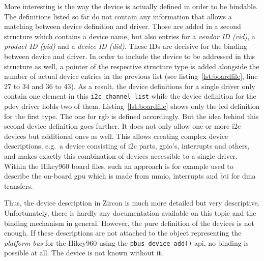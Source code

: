 More interesting is the way the device is actually defined in order to be bindable.
The definitions listed so far do not contain any information that allows a matching between device definition and driver.
Those are added in a second structure which contains a device name, but also entries for a \textit{vendor ID (vid)}, a \textit{product ID (pid)} and a \textit{device ID (did)}.
These IDs are decisive for the binding between device and driver.
In order to include the device to be addressed in this structure as well, a pointer of the respective structure type is added alongside the number of actual device entries in the previous list (see listing~\ref{lst:boardfile}, line 27 to 34 and 36 to 43).
%
As a result, the device definitions for a single driver only contain one element in this \texttt{i2c_channel_list} while the device definition for the pdev driver holds two of them.
Listing~\ref{lst:boardfile} shows only the \ac{lcd} definition for the first type.
The one for \ac{rgb} is defined accordingly.
But the idea behind this second device definition goes further.
It does not only allow one or more \ac{i2c} devices but additional ones as well.
This allows creating complex device descriptions, e.g.\ a device consisting of \ac{i2c} parts, \ac{gpio}'s, interrupts and others, and makes exactly this combination of devices accessible to a single driver.
Within the Hikey960 board files, such an approach is for example used to describe the on-board \ac{gpu} which is made from \ac{mmio}, interrupts and \ac{bti} for \ac{dma} transfers.

Thus, the device description in Zircon is much more detailed but very descriptive.
Unfortunately, there is hardly any documentation available on this topic and the binding mechanism in general.
However, the pure definition of the devices is not enough.
If these descriptions are not attached to the object representing the \textit{platform bus} for the Hikey960 using the \texttt{pbus_device_add()} \ac{api}, no binding is possible at all.
The device is not known without it.

